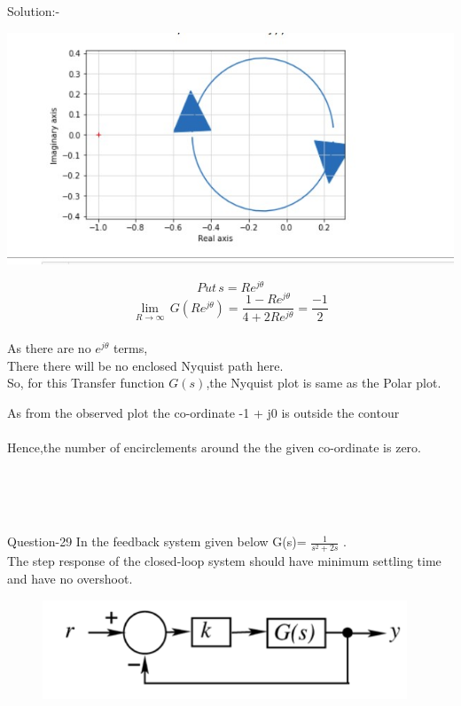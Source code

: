 \documentclass[journal,12pt,twocolumn]{IEEEtran}
\begin{document}
\begin{frame}{Solution:- }
\begin{frame}{}
\end{frame}

\begin{frame}{}
\includegraphics[scale = 0.5]{./figs/updated.jpg}
\end{frame}

\begin{frame}{}
    $$Put\,s=Re^{j\theta}$$
    $$\lim_{R\to \infty}\,G(Re^{j\theta})=\frac{1-Re^{j\theta}}{4+2Re^{j\theta}}=\frac{-1}{2}$$ \\
    \bigskip
    As there are no $e^{j\theta}$ terms, 
    \\
    There there will be no enclosed Nyquist path here. 
    \\
    So, for this Transfer function $G(s)$,the Nyquist plot is same as the Polar plot.
    
\end{frame}

\begin{frame}{}
As from the observed plot the co-ordinate -1 + j0 is outside the contour
\\
\bigskip
\\
Hence,the number of encirclements around the the given co-ordinate is zero.
\end{frame}
\\
\\\\
\begin{frame}{Question-29 }
In the feedback system given below G(s)= \(\frac{1}{s^2+2s}\) .\\
The step response of the closed-loop system should have minimum settling time and have no overshoot.

\begin{figure}[h]
    \includegraphics[scale=0.5]{./figs/fig-8.png}
\end{figure}


\end{frame}
\end{frame}
\end{document}
